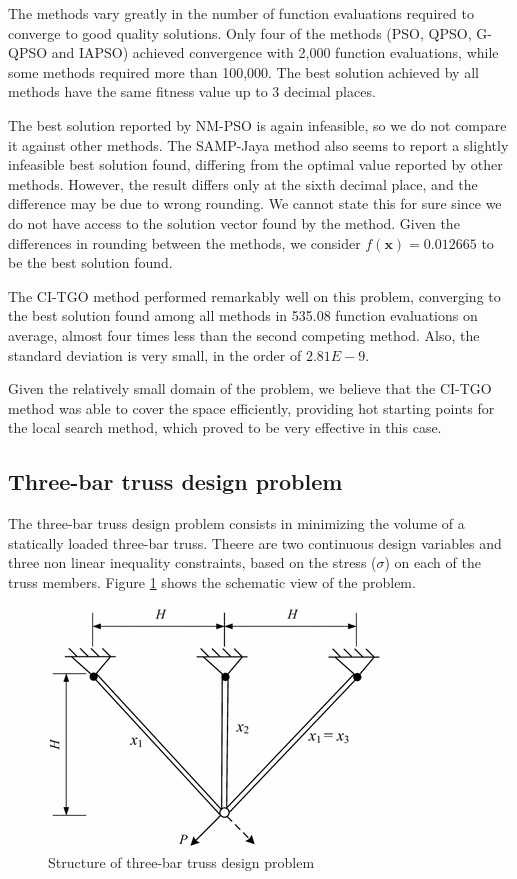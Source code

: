 


The methods vary greatly in the number of function evaluations required to converge to good quality solutions. Only four of the methods (PSO, QPSO, G-QPSO and IAPSO) achieved convergence with 2,000 function evaluations, while some methods required more than 100,000. The best solution achieved by all methods have the same fitness value up to 3 decimal places.
 
The best solution reported by NM-PSO is again infeasible, so we do not compare it against other methods. The SAMP-Jaya method also seems to report a slightly infeasible best solution found, differing from the optimal value reported by other methods. However, the result differs only at the sixth decimal place, and the difference may be due to wrong rounding. We cannot state this for sure since we do not have access to the solution vector found by the method. Given the differences in rounding between the methods, we consider $f(\bm{x}) = 0.012665$ to be the best solution found.

The CI-TGO method performed remarkably well on this problem, converging to the best solution found among all methods in 535.08 function evaluations on average, almost four times less than the second competing method. Also, the standard deviation is very small, in the order of $2.81E-9$. 

Given the relatively small domain of the problem, we believe that the CI-TGO method was able to cover the space efficiently, providing hot starting points for the local search method, which proved to be very effective in this case.




\subsection{Three-bar truss design problem}

The three-bar truss design problem \citep{TB} consists in minimizing the volume of a statically loaded three-bar truss. Theere are two continuous design variables and three non linear inequality constraints, based on the stress ($\sigma$) on each of the truss members. Figure \ref{fig:TB} shows the schematic view of the problem.

\begin{figure}[h]
\begin{center}
\includegraphics[scale=0.5]{Imgs/TB.png}
\end{center}
\captionsetup{justification=centering}
\caption{Structure of three-bar truss design problem}\label{fig:TB}
\end{figure}


